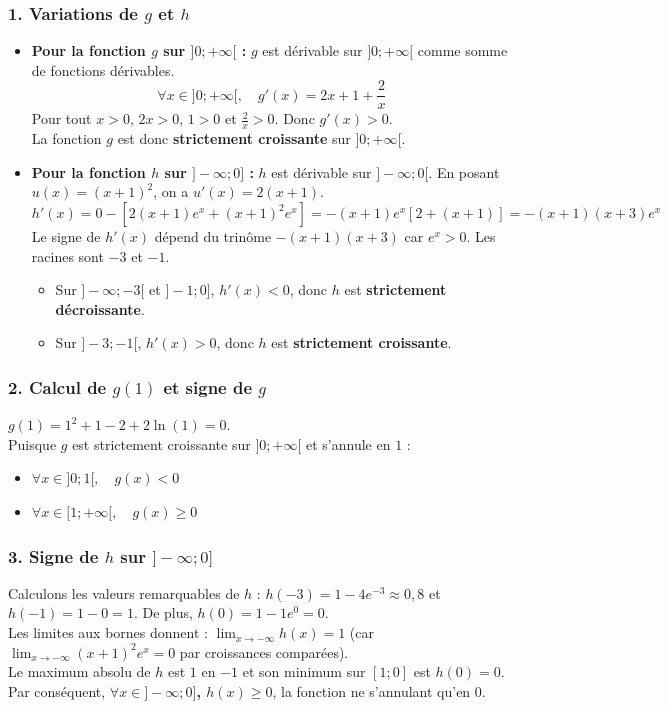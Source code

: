 \documentclass[12pt,a4paper]{article}
\begin{document}
\subsubsection*{1. Variations de $g$ et $h$}
\begin{itemize}
    \item \textbf{Pour la fonction $g$ sur $]0; +\infty[$ :}
    $g$ est dérivable sur $]0; +\infty[$ comme somme de fonctions dérivables. 
    \[ \forall x \in ]0; +\infty[, \quad g'(x) = 2x + 1 + \frac{2}{x} \]
    Pour tout $x > 0$, $2x > 0$, $1 > 0$ et $\frac{2}{x} > 0$. Donc $g'(x) > 0$. \\
    La fonction $g$ est donc \textbf{strictement croissante} sur $]0; +\infty[$.
    
    \item \textbf{Pour la fonction $h$ sur $]-\infty; 0]$ :}
    $h$ est dérivable sur $]-\infty; 0[$. En posant $u(x) = (x+1)^2$, on a $u'(x) = 2(x+1)$.
    \[ h'(x) = 0 - \left[ 2(x+1)e^x + (x+1)^2e^x \right] = -(x+1)e^x \left[ 2 + (x+1) \right] = -(x+1)(x+3)e^x \]
    Le signe de $h'(x)$ dépend du trinôme $-(x+1)(x+3)$ car $e^x > 0$. Les racines sont $-3$ et $-1$.
    \begin{itemize}
        \item Sur $]-\infty; -3[$ et $]-1; 0]$, $h'(x) < 0$, donc $h$ est \textbf{strictement décroissante}.
        \item Sur $]-3; -1[$, $h'(x) > 0$, donc $h$ est \textbf{strictement croissante}.
    \end{itemize}
\end{itemize}

\subsubsection*{2. Calcul de $g(1)$ et signe de $g$}
$g(1) = 1^2 + 1 - 2 + 2\ln(1) = 0$. \\
Puisque $g$ est strictement croissante sur $]0; +\infty[$ et s'annule en $1$ :
\begin{itemize}
    \item $\forall x \in ]0; 1[, \quad g(x) < 0$
    \item $\forall x \in [1; +\infty[, \quad g(x) \ge 0$
\end{itemize}

\subsubsection*{3. Signe de $h$ sur $]-\infty; 0]$}
Calculons les valeurs remarquables de $h$ : $h(-3) = 1 - 4e^{-3} \approx 0,8$ et $h(-1) = 1 - 0 = 1$. De plus, $h(0) = 1 - 1e^0 = 0$. \\
Les limites aux bornes donnent : $\lim_{x \to -\infty} h(x) = 1$ (car $\lim_{x \to -\infty} (x+1)^2e^x = 0$ par croissances comparées). \\
Le maximum absolu de $h$ est $1$ en $-1$ et son minimum sur $[1; 0]$ est $h(0) = 0$. Par conséquent, \textbf{$\forall x \in ]-\infty; 0]$, $h(x) \ge 0$}, la fonction ne s'annulant qu'en $0$.
\end{document}
